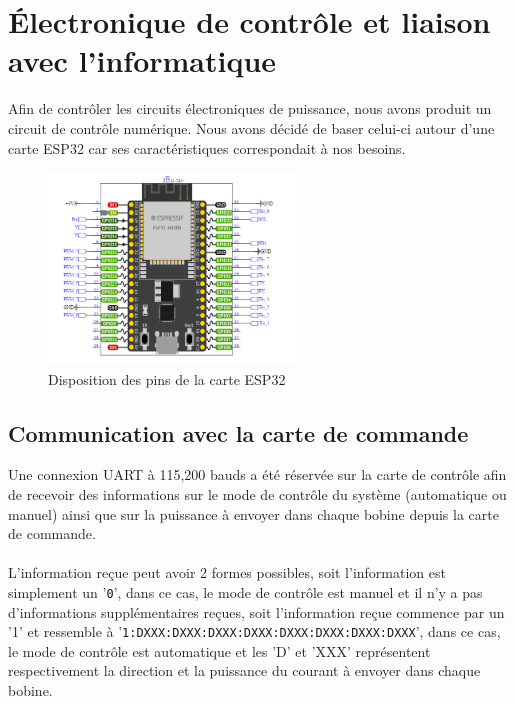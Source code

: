 \documentclass{article}
\begin{document}
\section{Électronique de contrôle et liaison avec l'informatique}
    Afin de contrôler les circuits électroniques de puissance, nous avons produit un circuit de contrôle numérique. Nous avons décidé de baser celui-ci autour d'une carte ESP32 car ses caractéristiques correspondait à nos besoins.

    \begin{figure}[H]
    \centering
        \includegraphics[width = 0.6\textwidth]{Images/ESP32 - pins - clean.png}
        \caption{Disposition des pins de la carte ESP32}
        \label{fig:ESP32 - pins}
    \end{figure}

    \subsection{Communication avec la carte de commande}
        Une connexion UART à 115,200 bauds a été réservée sur la carte de contrôle afin de recevoir des informations sur le mode de contrôle du système (automatique ou manuel) ainsi que sur la puissance à envoyer dans chaque bobine depuis la carte de commande.
        \\\\
        L'information reçue peut avoir 2 formes possibles, soit l'information est simplement un '\verb+0+', dans ce cas, le mode de contrôle est manuel et il n'y a pas d'informations supplémentaires reçues, soit l'information reçue commence par un '1' et ressemble à '\verb+1:DXXX:DXXX:DXXX:DXXX:DXXX:DXXX:DXXX:DXXX+', dans ce cas, le mode de contrôle est automatique et les 'D' et 'XXX' représentent respectivement la direction et la puissance du courant à envoyer dans chaque bobine.
\end{document}
